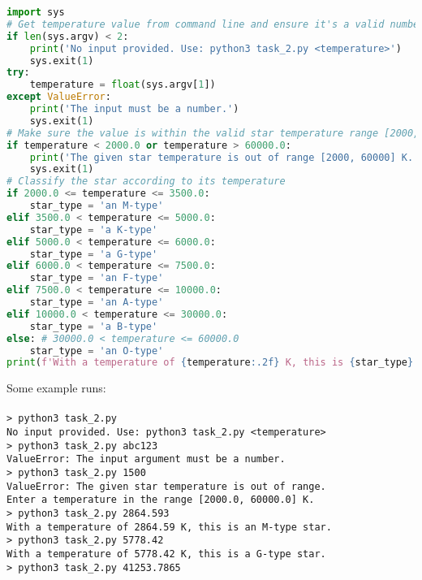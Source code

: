 \documentclass[a4paper,12pt]{article}
\DeclareRobustCommand{\bold}{\fontseries{b}\selectfont}
\newcommand{\rcode}[1]{\texttt{\fontsize{11}{13}\selectfont#1}}
\newcommand{\bcode}[1]{\texttt{\fontsize{11}{13}\selectfont\bold#1}}
\newenvironment{solution}{}{}
\begin{document}
\begin{enumerate}
\begin{solution}
\begin{lstlisting}[language=python]
  import sys
# Get temperature value from command line and ensure it's a valid number
if len(sys.argv) < 2:
    print('No input provided. Use: python3 task_2.py <temperature>')
    sys.exit(1)
try:
    temperature = float(sys.argv[1])
except ValueError:
    print('The input must be a number.')
    sys.exit(1)
# Make sure the value is within the valid star temperature range [2000, 60000] K
if temperature < 2000.0 or temperature > 60000.0:
    print('The given star temperature is out of range [2000, 60000] K.')
    sys.exit(1)
# Classify the star according to its temperature
if 2000.0 <= temperature <= 3500.0:
    star_type = 'an M-type'
elif 3500.0 < temperature <= 5000.0:
    star_type = 'a K-type'
elif 5000.0 < temperature <= 6000.0:
    star_type = 'a G-type'
elif 6000.0 < temperature <= 7500.0:
    star_type = 'an F-type'
elif 7500.0 < temperature <= 10000.0:
    star_type = 'an A-type'
elif 10000.0 < temperature <= 30000.0:
    star_type = 'a B-type'
else: # 30000.0 < temperature <= 60000.0
    star_type = 'an O-type'
print(f'With a temperature of {temperature:.2f} K, this is {star_type} star.')\end{lstlisting}
  \vspace{1em}Some example runs:\\
  \\\bcode{> python3 task\_2.py}
  \\\rcode{No input provided. Use: python3 task\_2.py <temperature>}\vspace{1.5mm}
  \\\bcode{> python3 task\_2.py abc123}
  \\\rcode{ValueError: The input argument must be a number.}\vspace{1.5mm}
  \\\bcode{> python3 task\_2.py 1500}
  \\\rcode{ValueError: The given star temperature is out of range.}
  \\\rcode{Enter a temperature in the range [2000.0, 60000.0] K.}\vspace{1.5mm}
  \\\bcode{> python3 task\_2.py 2864.593}
  \\\rcode{With a temperature of 2864.59 K, this is an M-type star.}\vspace{1.5mm}
  \\\bcode{> python3 task\_2.py 5778.42}
  \\\rcode{With a temperature of 5778.42 K, this is a G-type star.}\vspace{1.5mm}
  \\\bcode{> python3 task\_2.py 41253.7865}

\end{solution}
\end{enumerate}
\end{document}
